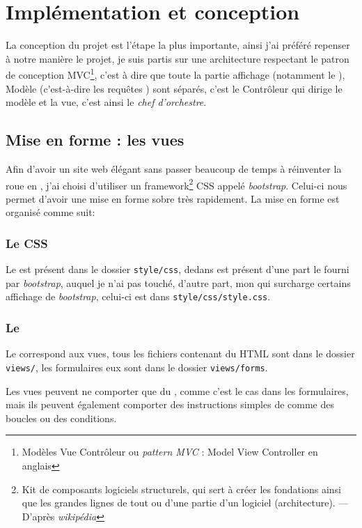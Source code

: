 \documentclass[12pt,a4paper,openany]{book}
\newcommand{\bootstrap}{\textit{bootstrap}}
\begin{document}
	\chapter{Implémentation et conception}
		La conception du projet est l'étape la plus importante, ainsi j'ai préféré repenser à notre manière le projet, 
		je suis partis sur une architecture respectant le patron de conception MVC\footnote{Modèles Vue Contrôleur ou
		\textit{pattern MVC} : Model View Controller en anglais}, c'est à
		dire que toute la partie affichage (notamment le ), Modèle (c'est-à-dire les requêtes ) sont séparés, c'est le Contrôleur qui dirige le
		modèle et la vue, c'est ainsi le \textit{chef d'orchestre}.
		\section{Mise en forme : les vues}
			Afin d'avoir un site web élégant sans passer beaucoup de temps à réinventer la roue en , j'ai choisi d'utiliser un
			framework\footnote{Kit de composants logiciels structurels, qui sert à créer les fondations ainsi que les grandes lignes de tout ou d’une partie d'un
			logiciel (architecture). --- D'après \textit{wikipédia}} CSS
			appelé \bootstrap{}. Celui-ci nous permet d'avoir une mise en forme sobre très rapidement.  La mise en forme est organisé comme suit:

			\subsection{Le CSS} Le  est présent dans le dossier \texttt{style/css}, dedans est présent d'une part le
			 fourni par \bootstrap{}, auquel je n'ai pas touché, d'autre part, mon  qui surcharge certains affichage de \bootstrap{}, celui-ci est dans \texttt{style/css/style.css}.
			
				
		\subsection{Le }
		Le  correspond aux vues, tous les fichiers contenant du HTML sont dans le dossier \texttt{views/}, les formulaires 
		eux sont dans le dossier \texttt{views/forms}.
		
		Les vues peuvent ne comporter que du , comme c'est le cas dans les formulaires, mais ils peuvent également comporter des instructions simples
		de  comme des boucles ou des conditions.
\end{document}
